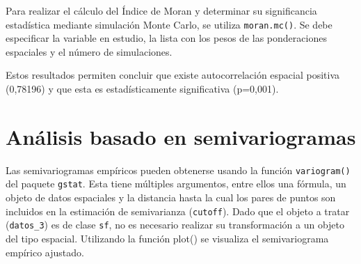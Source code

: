 \documentclass[11pt,b5paper,]{krantz}
\newenvironment{Shaded}{}{}
\newcommand{\KeywordTok}[1]{\textcolor[rgb]{0.00,0.44,0.13}{\textbf{#1}}}
\newcommand{\DataTypeTok}[1]{\textcolor[rgb]{0.56,0.13,0.00}{#1}}
\newcommand{\DecValTok}[1]{\textcolor[rgb]{0.25,0.63,0.44}{#1}}
\newcommand{\StringTok}[1]{\textcolor[rgb]{0.25,0.44,0.63}{#1}}
\newcommand{\CommentTok}[1]{\textcolor[rgb]{0.38,0.63,0.69}{\textit{#1}}}
\newcommand{\OtherTok}[1]{\textcolor[rgb]{0.00,0.44,0.13}{#1}}
\newcommand{\OperatorTok}[1]{\textcolor[rgb]{0.40,0.40,0.40}{#1}}
\newcommand{\NormalTok}[1]{#1}
\begin{document}
\begin{Shaded}
\end{Shaded}

Para realizar el cálculo del Índice de Moran y determinar su
significancia estadística mediante simulación Monte Carlo, se utiliza
\texttt{moran.mc()}. Se debe especificar la variable en estudio, la
lista con los pesos de las ponderaciones espaciales y el número de
simulaciones.

\begin{Shaded}
\end{Shaded}

Estos resultados permiten concluir que existe autocorrelación espacial
positiva (0,78196) y que esta es estadísticamente significativa
(p=0,001).

\section{Análisis basado en
semivariogramas}\label{anuxe1lisis-basado-en-semivariogramas}

Las semivariogramas empíricos pueden obtenerse usando la función
\texttt{variogram()} del paquete \texttt{gstat}. Esta tiene múltiples
argumentos, entre ellos una fórmula, un objeto de datos espaciales y la
distancia hasta la cual los pares de puntos son incluidos en la
estimación de semivarianza (\texttt{cutoff}). Dado que el objeto a
tratar (\texttt{datos\_3}) es de clase \texttt{sf}, no es necesario
realizar su transformación a un objeto del tipo espacial. Utilizando la
función plot() se visualiza el semivariograma empírico ajustado.
\end{document}
